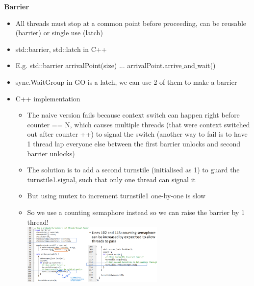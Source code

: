 \documentclass[10pt, landscape]{article}
\begin{document}
\begin{multicols}{4}
\textbf{Barrier} \\
\begin{itemize}
    \item All threads must stop at a common point before proceeding, can be reusable (barrier) or single use (latch)
    \item std::barrier, std::latch in C++
    \item E.g. std::barrier arrivalPoint(size) ... arrivalPoint.arrive$\_$and$\_$wait()
    \item sync.WaitGroup in GO is a latch, we can use 2 of them to make a barrier
    \item C++ implementation
    \begin{itemize}
        \item The naive version fails because context switch can happen right before counter == N, which causes multiple threads (that were context switched out after counter ++) to signal the switch (another way to fail is to have 1 thread lap everyone else between the first barrier unlocks and second barrier unlocks)
        \item The solution is to add a second turnstile (initialised as 1) to guard the turnstile1.signal, such that only one thread can signal it
        \item But using mutex to increment turnstile1 one-by-one is slow 
        \item So we use a counting semaphore instead so we can raise the barrier by 1 thread!  \\ 
        \includegraphics*[width = 7cm, height = 3cm]{barrier.png}
    \end{itemize}
\end{itemize}


\end{multicols}
\end{document}
